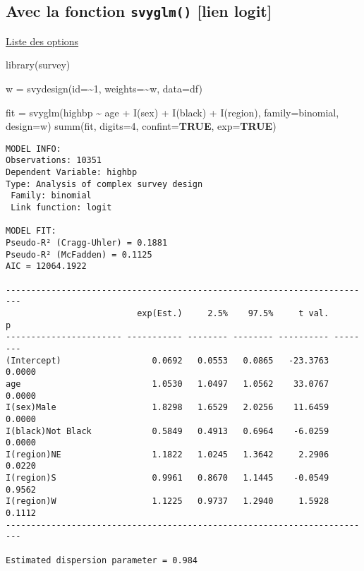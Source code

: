 \documentclass[
  letterpaper,
  DIV=11,
  numbers=noendperiod]{scrartcl}
\newenvironment{Shaded}{\begin{snugshade}}{\end{snugshade}}
\newcommand{\AttributeTok}[1]{\textcolor[rgb]{1.00,0.47,0.78}{#1}}
\newcommand{\ConstantTok}[1]{\textcolor[rgb]{0.74,0.58,0.98}{\textbf{#1}}}
\newcommand{\DecValTok}[1]{\textcolor[rgb]{0.74,0.58,0.98}{#1}}
\newcommand{\FunctionTok}[1]{\textcolor[rgb]{0.31,0.98,0.48}{#1}}
\newcommand{\NormalTok}[1]{\textcolor[rgb]{0.97,0.97,0.95}{#1}}
\newcommand{\OtherTok}[1]{\textcolor[rgb]{0.31,0.98,0.48}{#1}}
\newcommand{\SpecialCharTok}[1]{\textcolor[rgb]{1.00,0.47,0.78}{#1}}
\begin{document}
\hypertarget{avec-la-fonction-svyglm-lien-logit}{%
\subsection{\texorpdfstring{Avec la fonction \texttt{svyglm()} {[}lien
logit{]}}{Avec la fonction svyglm() {[}lien logit{]}}}\label{avec-la-fonction-svyglm-lien-logit}}

\href{https://jtools.jacob-long.com/reference/summ.svyglm.html}{Liste
des options}

\begin{Shaded}
\begin{Highlighting}[]
\FunctionTok{library}\NormalTok{(survey)}

\NormalTok{w }\OtherTok{=} \FunctionTok{svydesign}\NormalTok{(}\AttributeTok{id=}\SpecialCharTok{\textasciitilde{}}\DecValTok{1}\NormalTok{, }\AttributeTok{weights=}\SpecialCharTok{\textasciitilde{}}\NormalTok{w, }\AttributeTok{data=}\NormalTok{df)}

\NormalTok{fit }\OtherTok{=} \FunctionTok{svyglm}\NormalTok{(highbp }\SpecialCharTok{\textasciitilde{}}\NormalTok{ age }\SpecialCharTok{+} \FunctionTok{I}\NormalTok{(sex) }\SpecialCharTok{+} \FunctionTok{I}\NormalTok{(black) }\SpecialCharTok{+} \FunctionTok{I}\NormalTok{(region), }\AttributeTok{family=}\NormalTok{binomial, }\AttributeTok{design=}\NormalTok{w)}
\FunctionTok{summ}\NormalTok{(fit, }\AttributeTok{digits=}\DecValTok{4}\NormalTok{, }\AttributeTok{confint=}\ConstantTok{TRUE}\NormalTok{, }\AttributeTok{exp=}\ConstantTok{TRUE}\NormalTok{)    }
\end{Highlighting}
\end{Shaded}

\begin{verbatim}
MODEL INFO:
Observations: 10351
Dependent Variable: highbp
Type: Analysis of complex survey design 
 Family: binomial 
 Link function: logit 

MODEL FIT:
Pseudo-R² (Cragg-Uhler) = 0.1881
Pseudo-R² (McFadden) = 0.1125
AIC = 12064.1922 

-------------------------------------------------------------------------
                          exp(Est.)     2.5%    97.5%     t val.        p
----------------------- ----------- -------- -------- ---------- --------
(Intercept)                  0.0692   0.0553   0.0865   -23.3763   0.0000
age                          1.0530   1.0497   1.0562    33.0767   0.0000
I(sex)Male                   1.8298   1.6529   2.0256    11.6459   0.0000
I(black)Not Black            0.5849   0.4913   0.6964    -6.0259   0.0000
I(region)NE                  1.1822   1.0245   1.3642     2.2906   0.0220
I(region)S                   0.9961   0.8670   1.1445    -0.0549   0.9562
I(region)W                   1.1225   0.9737   1.2940     1.5928   0.1112
-------------------------------------------------------------------------

Estimated dispersion parameter = 0.984 
\end{verbatim}
\end{document}
